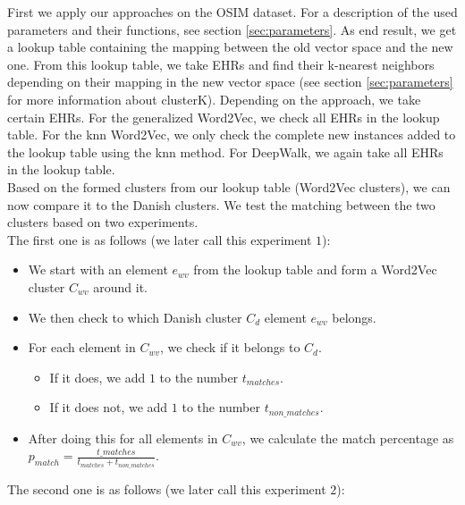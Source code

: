 First we apply our approaches on the OSIM dataset. For a description of the used parameters and their functions, see section \ref{sec:parameters}. As end result, we get a lookup table containing the mapping between the old vector space and the new one. From this lookup table, we take EHRs and find their k-nearest neighbors depending on their mapping in the new vector space (see section \ref{sec:parameters} for more information about clusterK). Depending on the approach, we take certain EHRs. For the generalized Word2Vec, we check all EHRs in the lookup table. For the knn Word2Vec, we only check the complete new instances added to the lookup table using the knn method. For DeepWalk, we again take all EHRs in the lookup table. \\

Based on the formed clusters from our lookup table (Word2Vec clusters), we can now compare it to the Danish clusters. We test the matching between the two clusters based on two experiments. \\
The first one is as follows (we later call this experiment $1$):

\begin{itemize}

\item We start with an element $e_{wv}$ from the lookup table and form a Word2Vec cluster $C_{wv}$ around it.
\item We then check to which Danish cluster $C_d$ element $e_{wv}$ belongs.
\item For each element in $C_{wv}$, we check if it belongs to $C_d$.
\begin{itemize}
\item If it does, we add $1$ to the number $t_{matches}$.
\item If it does not, we add $1$ to the number $t_{non\_matches}$.
\end{itemize}
\item After doing this for all elements in $C_{wv}$, we calculate the match percentage as $p_{match} = \frac{t\_{matches}}{t_{matches} + t_{non\_matches}}$.

\end{itemize}

The second one is as follows (we later call this experiment $2$):

